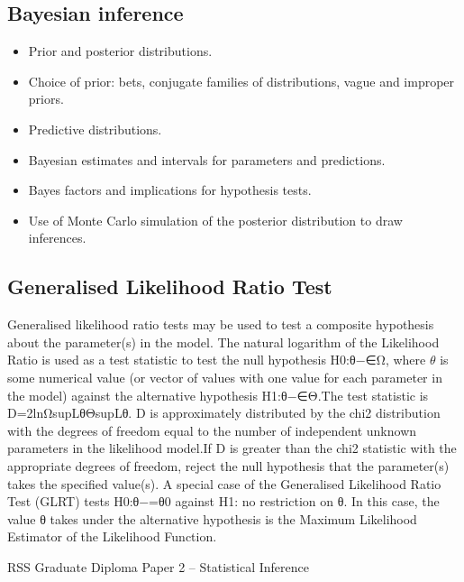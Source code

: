 \subsection*{Bayesian inference}

\begin{itemize}
\item	Prior and posterior distributions. 
\item	Choice of prior: bets, conjugate families of distributions, vague and improper priors. 
\item	Predictive distributions. 
\item	Bayesian estimates and intervals for parameters and predictions. 
\item	Bayes factors and implications for hypothesis tests. 
\item	Use of Monte Carlo simulation of the posterior distribution to draw inferences.
\end{itemize}
\newpage
\subsection*{Generalised Likelihood Ratio Test}
Generalised likelihood ratio tests may be used to test a composite hypothesis about the parameter(s) in the model.
The natural logarithm of the Likelihood Ratio is used as a test statistic to test the null hypothesis H0:θ−∈Ω, where 
$\theta$ is some numerical value (or vector of values with one value for each parameter in the model) against the 
alternative hypothesis H1:θ−∈Θ.The test statistic is D=2lnΩsupLθΘsupLθ. 
D is approximately distributed by the chi2 distribution with the degrees of freedom equal to the number of 
independent unknown parameters in the likelihood model.If D is greater than the chi2 statistic with the 
appropriate degrees of freedom, reject the null hypothesis that the parameter(s) takes the specified value(s).
A special case of the Generalised Likelihood Ratio Test (GLRT) tests H0:θ−=θ0 against H1: no restriction on θ. 
In this case, the value θ takes under the alternative hypothesis is the Maximum Likelihood Estimator of the 
Likelihood Function.
 
 \newpage
 
 

RSS Graduate Diploma Paper 2 – Statistical Inference

 

 



